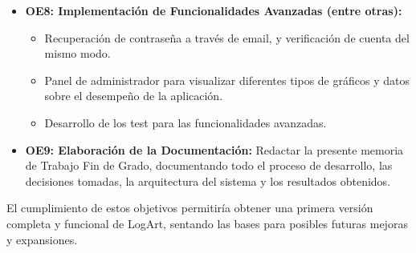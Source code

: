 \begin{itemize}
    \item \textbf{OE8: Implementación de Funcionalidades Avanzadas (entre otras):}
        \begin{itemize}
            \item Recuperación de contraseña a través de email, y verificación de cuenta del mismo modo.
            \item Panel de administrador para visualizar diferentes tipos de gráficos y datos sobre el desempeño de la aplicación.
            \item Desarrollo de los test para las funcionalidades avanzadas.     
        \end{itemize}
    \item \textbf{OE9: Elaboración de la Documentación:}
    Redactar la presente memoria de Trabajo Fin de Grado, documentando todo el proceso de desarrollo, las decisiones tomadas, la arquitectura del sistema y los resultados obtenidos.
\end{itemize}

El cumplimiento de estos objetivos permitiría obtener una primera versión completa y funcional de LogArt, sentando las bases para posibles futuras mejoras y expansiones.